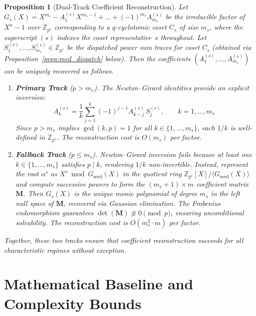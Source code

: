 \documentclass[12pt]{article}
\theoremstyle{plain}
\newtheorem{prop}[thm]{Proposition}
\begin{document}
\begin{prop}[Dual-Track Coefficient Reconstruction] \label{prop:dual_track}
Let $G_s(X) = X^{m_s} - A_1^{(s)} X^{m_s - 1} + \dots + (-1)^{m_s} A_{m_s}^{(s)}$ be the irreducible factor of $X^n - 1$ over $\mathbb{Z}_{p^e}$ corresponding to a $q$-cyclotomic coset $C_s$ of size $m_s$, where the superscript $(s)$ indexes the coset representative~$s$ throughout. Let $S_1^{(s)}, \dots, S_{m_s}^{(s)} \in \mathbb{Z}_{p^e}$ be the dispatched power sum traces for coset $C_s$ (obtained via Proposition~\ref{prop:med_dispatch} below). Then the coefficients $(A_1^{(s)}, \dots, A_{m_s}^{(s)})$ can be uniquely recovered as follows.

\begin{enumerate}
    \item[\textup{(1)}] \textbf{Primary Track} ($p > m_s$). The Newton--Girard identities \cite{Macdonald1995} provide an explicit inversion:
    \begin{equation} \label{eq:newton_girard}
        A_k^{(s)} = \frac{1}{k} \sum_{j=1}^{k} (-1)^{j-1} A_{k-j}^{(s)}\, S_j^{(s)}, \qquad k = 1, \dots, m_s
    \end{equation}
    Since $p > m_s$ implies $\gcd(k, p) = 1$ for all $k \in \{1, \dots, m_s\}$, each $1/k$ is well-defined in $\mathbb{Z}_{p^e}$. The reconstruction cost is $O(m_s)$ per factor.
    
    \item[\textup{(2)}] \textbf{Fallback Track} ($p \leq m_s$). Newton--Girard inversion fails because at least one $k \in \{1, \dots, m_s\}$ satisfies $p \mid k$, rendering $1/k$ non-invertible. Instead, represent the root $\alpha^s$ as $X^s \bmod G_{\text{seed}}(X)$ in the quotient ring $\mathbb{Z}_{p^e}[X]/\langle G_{\text{seed}}(X) \rangle$ and compute successive powers to form the $(m_s + 1) \times m$ coefficient matrix $\mathbf{M}$. Then $G_s(X)$ is the unique monic polynomial of degree $m_s$ in the left null space of $\mathbf{M}$, recovered via Gaussian elimination. The Frobenius endomorphism guarantees $\det(\mathbf{M}) \not\equiv 0 \pmod{p}$, ensuring unconditional solvability. The reconstruction cost is $O(m_s^2 \cdot m)$ per factor.
\end{enumerate}
Together, these two tracks ensure that coefficient reconstruction succeeds for all characteristic regimes without exception.
\end{prop}

\section{Mathematical Baseline and Complexity Bounds}
\end{document}
